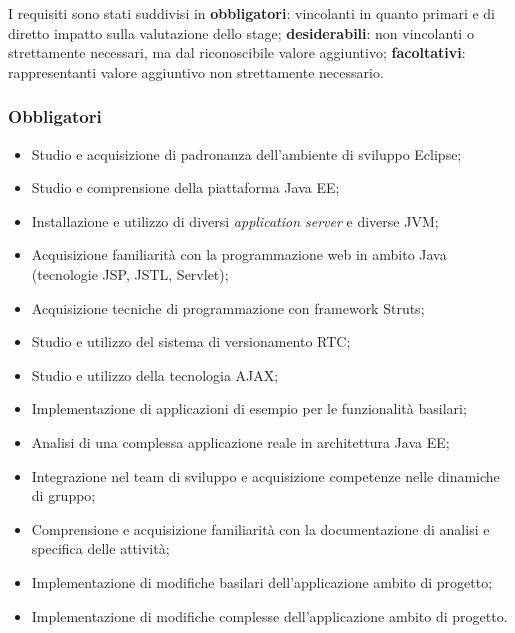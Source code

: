 	 I requisiti sono stati suddivisi in \textbf{obbligatori}: vincolanti in quanto primari e di diretto impatto sulla valutazione dello stage; \textbf{desiderabili}: non vincolanti o strettamente necessari, ma dal riconoscibile valore aggiuntivo; \textbf{facoltativi}: rappresentanti valore aggiuntivo non strettamente necessario.
	
	\subsubsection{Obbligatori}	
		\begin{itemize}
			\item Studio e acquisizione di padronanza dell'ambiente di sviluppo Eclipse;
			\item Studio e comprensione della piattaforma Java EE;
			\item Installazione e utilizzo di diversi \textit{application server} e diverse JVM;
			\item Acquisizione familiarità con la programmazione web in ambito Java (tecnologie JSP, JSTL, Servlet\glossario );
			\item Acquisizione tecniche di programmazione con framework Struts;
			\item Studio e utilizzo del sistema di versionamento RTC;
			\item Studio e utilizzo della tecnologia AJAX\glossario ;
			\item Implementazione di applicazioni di esempio per le funzionalità basilari;
			\item Analisi di una complessa applicazione reale in architettura Java EE;
			\item Integrazione nel team di sviluppo e acquisizione competenze nelle dinamiche di gruppo;
			\item Comprensione e acquisizione familiarità con la documentazione di analisi e specifica delle attività;
			\item Implementazione di modifiche basilari dell'applicazione ambito di progetto;
			\item Implementazione di modifiche complesse dell'applicazione ambito di progetto.
		\end{itemize}
		
